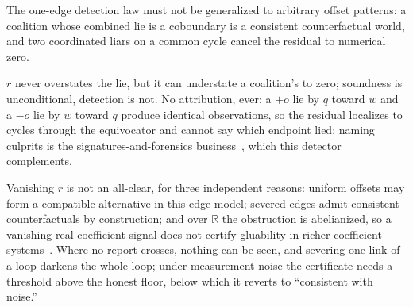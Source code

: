 \documentclass[11pt,a4paper]{article}
\theoremstyle{definition}
\theoremstyle{remark}
\begin{document}
\begin{pdboundary}
\setlength{\parskip}{4pt plus 1pt}
The one-edge detection law must not be generalized to arbitrary offset patterns: a coalition whose combined
lie is a coboundary is a consistent counterfactual world, and two coordinated
liars on a common cycle cancel the residual to numerical zero. 

$r$ never
overstates the lie, but it can understate a coalition's to zero; soundness is
unconditional, detection is not. No attribution, ever: a $+o$ lie by $q$ toward
$w$ and a $-o$ lie by $w$ toward $q$ produce identical observations, so the
residual localizes to cycles through the equivocator and cannot say which
endpoint lied; naming culprits is the signatures-and-forensics
business~, which this detector complements. 

Vanishing $r$ is not an
all-clear, for three independent reasons: uniform offsets may form a compatible alternative in this edge model; severed edges admit consistent
counterfactuals by construction; and over $\mathbb{R}$ the obstruction is
abelianized, so a vanishing real-coefficient signal does not certify gluability
in richer coefficient systems~. Where no report crosses, nothing can
be seen, and severing one link of a loop darkens the whole loop; under
measurement noise the certificate needs a threshold above the honest floor,
below which it reverts to ``consistent with noise.''
\end{pdboundary}
\end{document}
